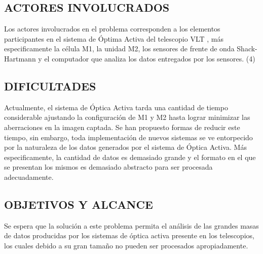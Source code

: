 \subsection{ACTORES INVOLUCRADOS}

Los actores involucrados en el problema corresponden a los elementos participantes en el sistema de Óptima Activa del telescopio VLT , más especificamente la célula M1, la unidad M2, los sensores de frente de onda Shack-Hartmann y el computador que analiza los datos entregados por los sensores. (4)

\subsection{DIFICULTADES}

Actualmente, el sistema de Óptica Activa tarda una cantidad de tiempo considerable ajustando la configuración de M1 y M2 hasta lograr minimizar las aberraciones en la imagen captada.
Se han propuesto formas de reducir este tiempo, sin embargo, toda implementación de nuevos sistemas se ve entorpecido por la naturaleza de los datos generados por el sistema de Óptica Activa.
Más especificamente, la cantidad de datos es demasiado grande y el formato en el que se presentan los mismos es demasiado abstracto para ser procesada adecuadamente.

\subsection{OBJETIVOS Y ALCANCE}

Se espera que la solución a este problema permita el análisis de las grandes masas de datos producidas por los sistemas de óptica activa presente en los telescopios, los cuales debido a su gran tamaño no pueden ser procesados apropiadamente.